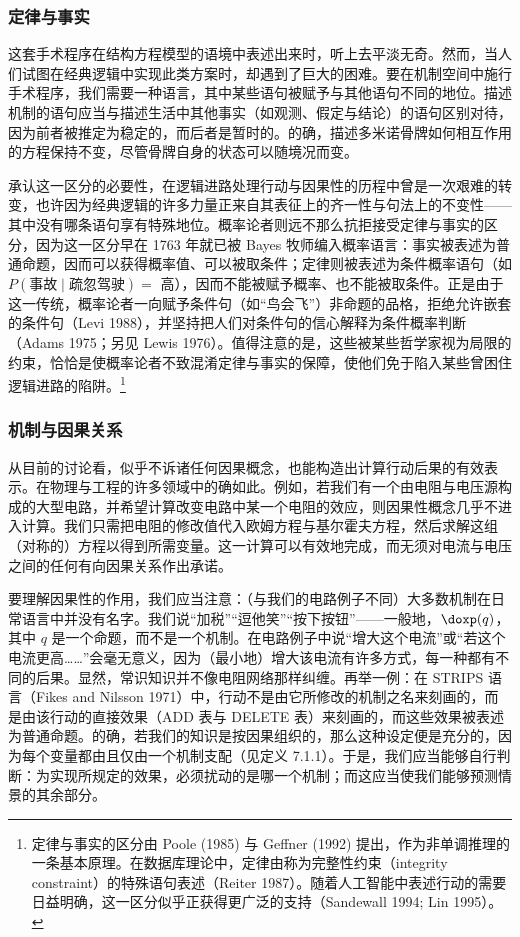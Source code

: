 \subsubsection*{定律与事实}

这套手术程序在结构方程模型的语境中表述出来时，听上去平淡无奇。然而，当人们试图在经典逻辑中实现此类方案时，却遇到了巨大的困难。要在机制空间中施行手术程序，我们需要一种语言，其中某些语句被赋予与其他语句不同的地位。描述机制的语句应当与描述生活中其他事实（如观测、假定与结论）的语句区别对待，因为前者被推定为稳定的，而后者是暂时的。的确，描述多米诺骨牌如何相互作用的方程保持不变，尽管骨牌自身的状态可以随境况而变。

承认这一区分的必要性，在逻辑进路处理行动与因果性的历程中曾是一次艰难的转变，也许因为经典逻辑的许多力量正来自其表征上的齐一性与句法上的不变性——其中没有哪条语句享有特殊地位。概率论者则远不那么抗拒接受定律与事实的区分，因为这一区分早在 1763 年就已被 Bayes 牧师编入概率语言：事实被表述为普通命题，因而可以获得概率值、可以被取条件；定律则被表述为条件概率语句（如 $P(\text{事故}\mid\text{疏忽驾驶})=$ 高），因而不能被赋予概率、也不能被取条件。正是由于这一传统，概率论者一向赋予条件句（如“鸟会飞”）非命题的品格，拒绝允许嵌套的条件句（Levi 1988），并坚持把人们对条件句的信心解释为条件概率判断（Adams 1975；另见 Lewis 1976）。值得注意的是，这些被某些哲学家视为局限的约束，恰恰是使概率论者不致混淆定律与事实的保障，使他们免于陷入某些曾困住逻辑进路的陷阱。\footnote{定律与事实的区分由 Poole (1985) 与 Geffner (1992) 提出，作为非单调推理的一条基本原理。在数据库理论中，定律由称为完整性约束（integrity constraint）的特殊语句表述（Reiter 1987）。随着人工智能中表述行动的需要日益明确，这一区分似乎正获得更广泛的支持（Sandewall 1994; Lin 1995）。}

\subsubsection*{机制与因果关系}

从目前的讨论看，似乎不诉诸任何因果概念，也能构造出计算行动后果的有效表示。在物理与工程的许多领域中的确如此。例如，若我们有一个由电阻与电压源构成的大型电路，并希望计算改变电路中某一个电阻的效应，则因果性概念几乎不进入计算。我们只需把电阻的修改值代入欧姆方程与基尔霍夫方程，然后求解这组（对称的）方程以得到所需变量。这一计算可以有效地完成，而无须对电流与电压之间的任何有向因果关系作出承诺。

要理解因果性的作用，我们应当注意：（与我们的电路例子不同）大多数机制在日常语言中并没有名字。我们说“加税”“逗他笑”“按下按钮”——一般地，$\doxp(q)$，其中 $q$ 是一个命题，而不是一个机制。在电路例子中说“增大这个电流”或“若这个电流更高……”会毫无意义，因为（最小地）增大该电流有许多方式，每一种都有不同的后果。显然，常识知识并不像电阻网络那样纠缠。再举一例：在 STRIPS 语言（Fikes and Nilsson 1971）中，行动不是由它所修改的机制之名来刻画的，而是由该行动的直接效果（ADD 表与 DELETE 表）来刻画的，而这些效果被表述为普通命题。的确，若我们的知识是按因果组织的，那么这种设定便是充分的，因为每个变量都由且仅由一个机制支配（见定义 7.1.1）。于是，我们应当能够自行判断：为实现所规定的效果，必须扰动的是哪一个机制；而这应当使我们能够预测情景的其余部分。

